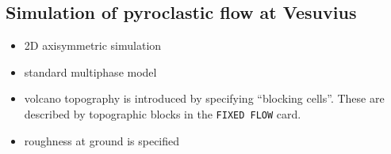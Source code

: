 %

\newpage
\subsection{Simulation of pyroclastic flow at Vesuvius}

\begin{itemize}
\item 2D axisymmetric simulation
\item standard multiphase model
\item volcano topography is introduced by specifying ``blocking cells''.
These are described by topographic blocks in the {\tt FIXED FLOW} card.
\item roughness at ground is specified
\end{itemize}

